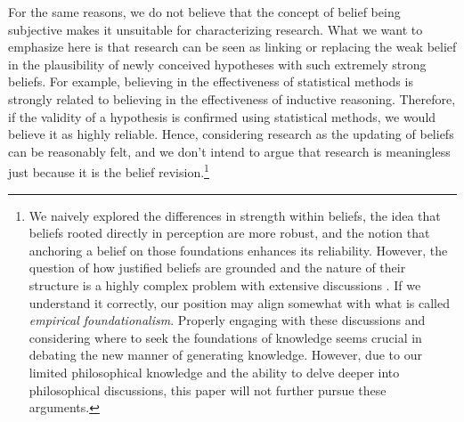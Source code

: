 For the same reasons, we do not believe that the concept of belief being subjective makes it unsuitable for characterizing research. What we want to emphasize here is that research can be seen as linking or replacing the weak belief in the plausibility of newly conceived hypotheses with such extremely strong beliefs. For example, believing in the effectiveness of statistical methods is strongly related to believing in the effectiveness of inductive reasoning. Therefore, if the validity of a hypothesis is confirmed using statistical methods, we would believe it as highly reliable. Hence, considering research as the updating of beliefs can be reasonably felt, and we don't intend to argue that research is meaningless just because it is the belief revision.\footnote{We naively explored the differences in strength within beliefs, the idea that beliefs rooted directly in perception are more robust, and the notion that anchoring a belief on those foundations enhances its reliability. However, the question of how justified beliefs are grounded and the nature of their structure is a highly complex problem with extensive discussions  \cite{sep-epistemology}. If we understand it correctly, our position may align somewhat with what is called \textit{empirical foundationalism}. Properly engaging with these discussions and considering where to seek the foundations of knowledge seems crucial in debating the new manner of generating knowledge. However, due to our limited philosophical knowledge and the ability to delve deeper into philosophical discussions, this paper will not further pursue these arguments.}





